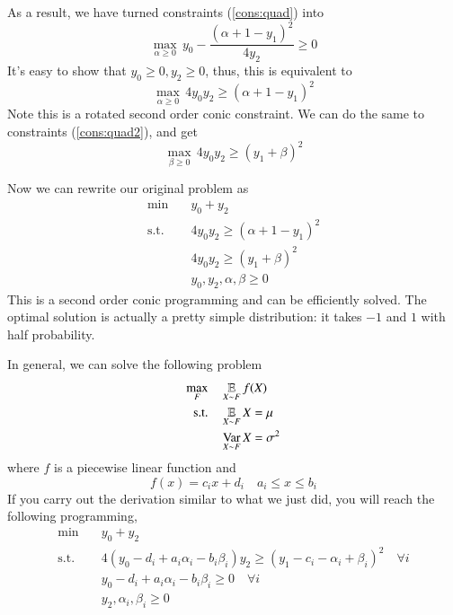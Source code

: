 As a result, we have turned constraints (\ref{cons:quad}) into
\[  \max_{\alpha \ge 0} \, y_0 - \frac{(\alpha + 1 - y_1)^2}{4y_2} \ge 0    \]
It's easy to show that $y_0 \ge 0, y_2 \ge 0$, thus, this is equivalent to
\[  \max_{\alpha \ge 0} \, 4 y_0 y_2 \ge (\alpha + 1 - y_1)^2    \]
Note this is a rotated second order conic constraint.
We can do the same to constraints (\ref{cons:quad2}), and get
\[  \max_{\beta \ge 0} \, 4 y_0 y_2 \ge (y_1 + \beta)^2    \]

Now we can rewrite our original problem as
\begin{align}
\min \quad & y_0 + y_2   \\
\text{s.t.} \quad & 4 y_0 y_2 \ge (\alpha + 1 - y_1)^2 \\
& 4 y_0 y_2 \ge (y_1 + \beta)^2 \\
& y_0, y_2, \alpha, \beta \ge 0
\end{align}
This is a second order conic programming and can be efficiently solved.
The optimal solution is actually a pretty simple distribution: it takes $-1$ and $1$ with half probability.

In general, we can solve the following problem
\begin{align}
\max_{F} \quad & \operatorname*{\mathbb{E}}_{X \sim F} f(X) \\
\text{s.t.} \quad & \operatorname*{\mathbb{E}}_{X \sim F} X = \mu    \\
& \operatorname*{Var}_{X \sim F} X = \sigma^2
\end{align}
where $f$ is a piecewise linear function and
\[ f(x) = c_ix + d_i \quad a_i \le x \le b_i    \]
If you carry out the derivation similar to what we just did,
you will reach the following programming,
\begin{align}
\min \quad & y_0 + y_2  \\
\text{s.t.} \quad & 4(y_0 - d_i + a_i \alpha_i - b_i \beta_i) y_2 \ge (y_1 - c_i - \alpha_i + \beta_i)^2 \quad \forall i    \\
& y_0 - d_i + a_i \alpha_i - b_i \beta_i \ge 0  \quad \forall i \\
& y_2, \alpha_i, \beta_i \ge 0
\end{align}